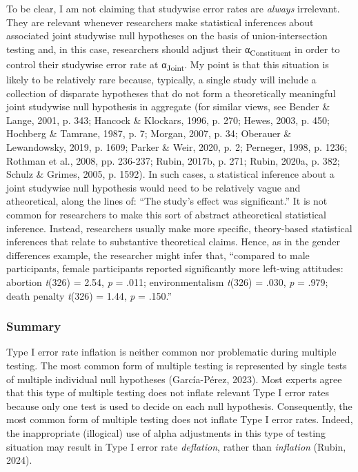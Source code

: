 \documentclass[authordate, meta]{jote-new-article}
\begin{document}
	To be clear, I am not claiming that studywise error rates are \emph{always} irrelevant. They are relevant whenever researchers make statistical inferences about associated joint studywise null hypotheses on the basis of union-intersection testing and, in this case, researchers should adjust their α\textsubscript{Constituent} in order to control their studywise error rate at α\textsubscript{Joint}. My point is that this situation is likely to be relatively rare because, typically, a single study will include a collection of disparate hypotheses that do not form a theoretically meaningful joint studywise null hypothesis in aggregate (for similar views, see Bender \& Lange, 2001, p. 343; Hancock \& Klockars, 1996, p. 270; Hewes, 2003, p. 450; Hochberg \& Tamrane, 1987, p. 7; Morgan, 2007, p. 34; Oberauer \& Lewandowsky, 2019, p. 1609; Parker \& Weir, 2020, p. 2; Perneger, 1998, p. 1236; Rothman et al., 2008, pp. 236-237; Rubin, 2017b, p. 271; Rubin, 2020a, p. 382; Schulz \& Grimes, 2005, p. 1592). In such cases, a statistical inference about a joint studywise null hypothesis would need to be relatively vague and atheoretical, along the lines of: “The study's effect was significant.” It is not common for researchers to make this sort of abstract atheoretical statistical inference. Instead, researchers usually make more specific, theory-based statistical inferences that relate to substantive theoretical claims. Hence, as in the gender differences example, the researcher might infer that, “compared to male participants, female participants reported significantly more left-wing attitudes: abortion \emph{t}(326) = 2.54, \emph{p} = .011; environmentalism \emph{t}(326) = .030, \emph{p} = .979; death penalty \emph{t}(326) = 1.44, \emph{p} = .150.”


	\subsubsection{Summary}



	Type I error rate inflation is neither common nor problematic during multiple testing. The most common form of multiple testing is represented by single tests of multiple individual null hypotheses (García-Pérez, 2023). Most experts agree that this type of multiple testing does not inflate relevant Type I error rates because only one test is used to decide on each null hypothesis. Consequently, the most common form of multiple testing does not inflate Type I error rates. Indeed, the inappropriate (illogical) use of alpha adjustments in this type of testing situation may result in Type I error rate \emph{deflation}, rather than \emph{inflation} (Rubin, 2024).
\end{document}
